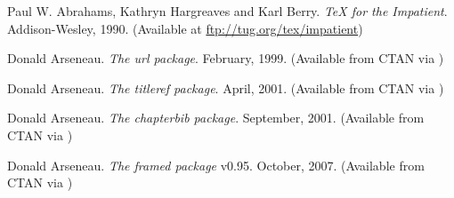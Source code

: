 \begin{thebibliography}{GMS94A}
\small

  Paul W. Abrahams, Kathryn Hargreaves and Karl Berry.
  \newblock \emph{TeX for the Impatient}.
  \newblock Addison-Wesley, 1990.
  \newblock (Available at
             \url{ftp://tug.org/tex/impatient})

\begin{comment}
\bibitem[Ado01]{ADOBEBOOK}
  \emph{How to Create Adobe PDF eBooks}.
  \newblock Adobe Systems Inc.,
  \newblock 2001.
  \newblock (Available from 
             \url{http://www.adobe.com/epaper/tips/acr5ebook/pdfs/eBook.pdf})
\end{comment}


  Donald Arseneau.
  \newblock \emph{The url package}.
  \newblock February, 1999.
  \newblock (Available from CTAN via
             )

  Donald Arseneau.
  \newblock \emph{The titleref package}.
  \newblock April, 2001.
  \newblock (Available from CTAN via
             )

  Donald Arseneau.
  \newblock \emph{The chapterbib package}.
  \newblock September, 2001.
  \newblock (Available from CTAN via 
             )

  Donald Arseneau.
  \newblock \emph{The framed package} v0.95.
  \newblock October, 2007.
  \newblock (Available from CTAN via
             )

\begin{comment}
\bibitem[Bar92]{BAROLINI92}
  Helen Barolini.
  \newblock \emph{Aldus and his Dream Book}.
  \newblock Italica Press, 1992.
  \newblock ISBN 0--934977--22--4.

\bibitem[Bar01]{BARTRAM01}
  Alan Bartram.
  \newblock \emph{Five hundred years of book design}.
  \newblock Yale university Press, 2001.
  \newblock ISBN 0--300--09058--7.
  \newblock (First published 2001 by The British Library)

\bibitem[BDG89]{BIGELOW89}
  Charles Bigelow, Paul Hayden Duensing and Linnea Gentry (Eds).
  \newblock \emph{Fine Print on Type}. 1989.
  \newblock Fine Print, CA (ISBN 0--9607290-X) or
  \newblock Bedford Arts, CA (ISBN 0--938491--17--2).


\end{comment}
\end{thebibliography}
